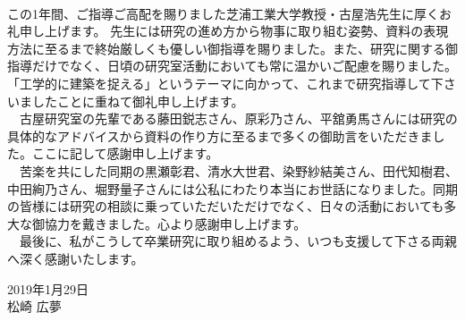 \begin{acknowledgment}
\thispagestyle{fancy}
\\この1年間、ご指導ご高配を賜りました芝浦工業大学教授・古屋浩先生に厚くお礼申し上げます。
先生には研究の進め方から物事に取り組む姿勢、資料の表現方法に至るまで終始厳しくも優しい御指導を賜りました。また、研究に関する御指導だけでなく、日頃の研究室活動においても常に温かいご配慮を賜りました。
「工学的に建築を捉える」というテーマに向かって、これまで研究指導して下さいましたことに重ねて御礼申し上げます。
\\　古屋研究室の先輩である藤田鋭志さん、原彩乃さん、平舘勇馬さんには研究の具体的なアドバイスから資料の作り方に至るまで多くの御助言をいただきました。ここに記して感謝申し上げます。
\\　苦楽を共にした同期の黒瀬彰君、清水大世君、染野紗結美さん、田代知樹君、中田絢乃さん、堀野量子さんには公私にわたり本当にお世話になりました。同期の皆様には研究の相談に乗っていただいただけでなく、日々の活動においても多大な御協力を戴きました。心より感謝申し上げます。
\\　最後に、私がこうして卒業研究に取り組めるよう、いつも支援して下さる両親へ深く感謝いたします。
\\
\begin{flushright}
2019年1月29日\\
松崎 広夢
\end{flushright}
\end{acknowledgment}
